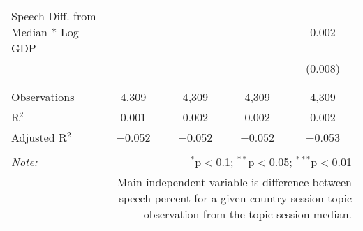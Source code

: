 \begin{table}[!htbp]
\begin{tabular}{@{\extracolsep{5pt}}lcccc}
 Speech Diff. from Median * Log GDP &  &  &  & 0.002 \\ 
  &  &  &  & (0.008) \\ 
  & & & & \\ 
\hline \\[-1.8ex] 
Observations & 4,309 & 4,309 & 4,309 & 4,309 \\ 
R$^{2}$ & 0.001 & 0.002 & 0.002 & 0.002 \\ 
Adjusted R$^{2}$ & $-$0.052 & $-$0.052 & $-$0.052 & $-$0.053 \\ 
\hline 
\hline \\[-1.8ex] 
\textit{Note:}  & \multicolumn{4}{r}{$^{*}$p$<$0.1; $^{**}$p$<$0.05; $^{***}$p$<$0.01} \\ 
 & \multicolumn{4}{r}{Main independent variable is difference between speech percent for a given country-session-topic observation from the topic-session median.} \\ 
\end{tabular} 
\end{table} 

